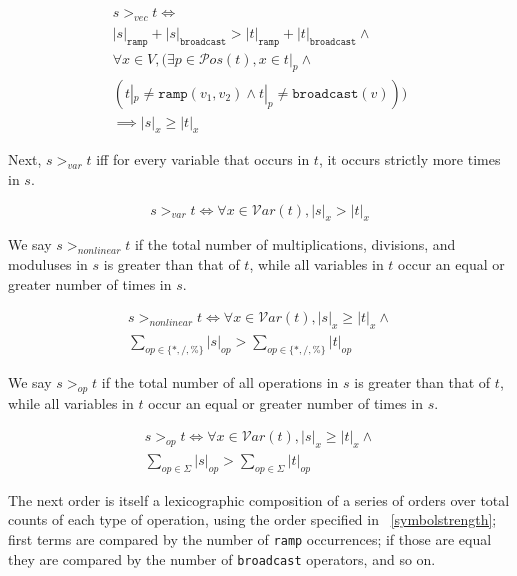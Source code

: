 \documentclass[sigplan,10pt,review,anonymous]{acmart}\settopmatter{printfolios=true,printccs=false,printacmref=false}
\begin{document}
\begin{gather*}
s >_{vec} t \iff \\
 |s|_{\texttt{ramp}} + |s|_{\texttt{broadcast}} > |t|_{\texttt{ramp}} + |t|_{\texttt{broadcast}} \wedge \\
\forall x \in V, (\exists p \in \mathcal{P}os(t), x \in t|_p \wedge \\
(t|_p \neq \texttt{ramp}(v_1,v_2) \wedge t|_p \neq \texttt{broadcast}(v))) \\
\implies |s|_x \geq |t|_x
\end{gather*}

Next, $s >_{var} t$ iff for every variable that occurs in $t$, it occurs strictly more times in $s$.

\begin{equation*}
s >_{var} t \iff \forall x \in \mathcal{V}ar(t), |s|_x > |t|_x
\end{equation*}

We say $s >_{nonlinear} t$ if the total number of multiplications, divisions, and moduluses in $s$ is greater than that of $t$, while all variables in $t$ occur an equal or greater number of times in $s$.

\begin{equation}
\begin{split}
s >_{nonlinear} t \iff \forall x \in \mathcal{V}ar(t), |s|_x \geq |t|_x \wedge \\
\sum_{op \in \{*,/,\%\}} |s|_{op} > \sum_{op \in \{*,/,\%\}} |t|_{op}
\end{split}
\end{equation}

We say $s >_{op} t$ if the total number of all operations in $s$ is greater than that of $t$, while all variables in $t$ occur an equal or greater number of times in $s$.

\begin{equation}
\begin{split}
s >_{op} t \iff \forall x \in \mathcal{V}ar(t), |s|_x \geq |t|_x \wedge \\
\sum_{op \in \Sigma} |s|_{op} > \sum_{op \in \Sigma} |t|_{op}
\end{split}
\end{equation}

The next order is itself a lexicographic composition of a series of orders over total counts of each type of operation, using the order specified in ~\ref{symbolstrength}; first terms are compared by the number of \texttt{ramp} occurrences; if those are equal they are compared by the number of \texttt{broadcast} operators, and so on. 
\end{document}
